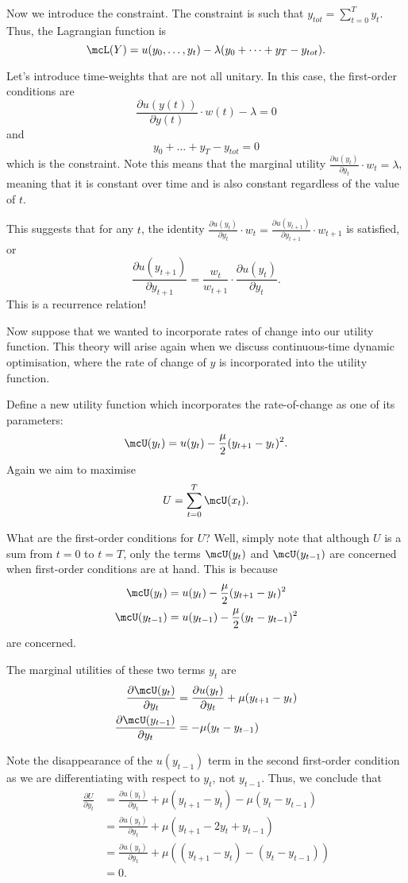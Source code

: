 \documentclass[a4paper, 12pt,oneside,openany]{book}
\begin{document}
Now we introduce the constraint. The constraint is such that $y_{tot} = \sum\limits_{t=0}^T y_t$. Thus, the Lagrangian function is $$\mcL(Y) = u(y_0, \dots, y_t)- \lambda (y_0+\dots+y_T - y_{tot}).$$ 

Let's introduce time-weights that are not all unitary. In this case, the first-order conditions are $$\frac{\partial u(y(t))}{\partial y(t)} \cdot w(t) - \lambda=0$$ and $$y_0+\dots+y_T - y_{tot}=0$$ which is the constraint. Note this means that the marginal utility $\frac{\partial u(y_t)}{\partial y_t} \cdot w_t =\lambda$, meaning that it is constant over time and is also constant regardless of the value of $t$. 

This suggests that for any $t$, the identity $\frac{\partial u(y_t)}{\partial y_t} \cdot w_t = \frac{\partial u(y_{t+1})}{\partial y_{t+1}} \cdot w_{t+1}$ is satisfied, or $$\frac{\partial u(y_{t+1})}{\partial y_{t+1}} = \frac{w_t}{w_{t+1}} \cdot \frac{\partial u(y_t)}{\partial y_t}.$$ This is a recurrence relation!

Now suppose that we wanted to incorporate rates of change into our utility function. This theory will arise again when we discuss continuous-time dynamic optimisation, where the rate of change of $y$ is incorporated into the utility function.  

Define a new utility function which incorporates the rate-of-change as one of its parameters: $$\mcU(y_t) = u(y_t) - \frac{\mu}{2} (y_{t+1}-y_t)^2.$$ Again we aim to maximise $$U =\sum\limits_{t=0}^T \mcU(x_t).$$ 

What are the first-order conditions for $U$? Well, simply note that although $U$ is a sum from $t=0$ to $t=T$, only the terms $\mcU(y_t)$ and $\mcU(y_{t-1})$ are concerned when first-order conditions are at hand. This is because \begin{align*} \mcU(y_t) &= u(y_t) - \frac{\mu}{2} (y_{t+1}-y_t)^2 \\ \mcU(y_{t-1}) &= u(y_{t-1}) - \frac{\mu}{2} (y_{t}-y_{t-1})^2 \end{align*} are concerned.

The marginal utilities of these two terms  $y_t$ are \begin{align*} \frac{\partial\mcU(y_t)}{\partial y_t} &= \frac{\partial u(y_t)}{\partial y_t} + \mu(y_{t+1}-y_t) \\ \frac{\partial \mcU(y_{t-1})}{\partial y_t} &= - \mu (y_{t}-y_{t-1}) \end{align*}

Note the disappearance of the $u(y_{t-1})$ term in the second first-order condition as we are differentiating with respect to $y_t$, not $y_{t-1}$. Thus, we conclude that \begin{align*} \frac{\partial U}{\partial y_t} &= \frac{\partial u(y_t)}{\partial y_t} + \mu(y_{t+1}-y_t) - \mu(y_t-y_{t-1}) \\ &= \frac{\partial u(y_t)}{\partial y_t} + \mu(y_{t+1}-2y_t+y_{t-1}) \\ &= \frac{\partial u(y_t)}{\partial y_t} + \mu((y_{t+1}-y_t)-(y_t-y_{t-1})) \\ &=0. \end{align*}
\end{document}
